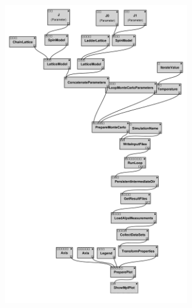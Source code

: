 \href{http://alps.comp-phys.org/vistrails/download.php?getvt=10&db=vistrails&host=alps.ethz.ch&port=3306&tag=&execute=False&showspreadsheetonly=False&embedWorkflow=False&version=166}{\includegraphics[width=8cm]{vistrails_images/alps.ethz.ch_vistrails_3306_10_166_pdf_graph/graph_10_166.pdf}
}